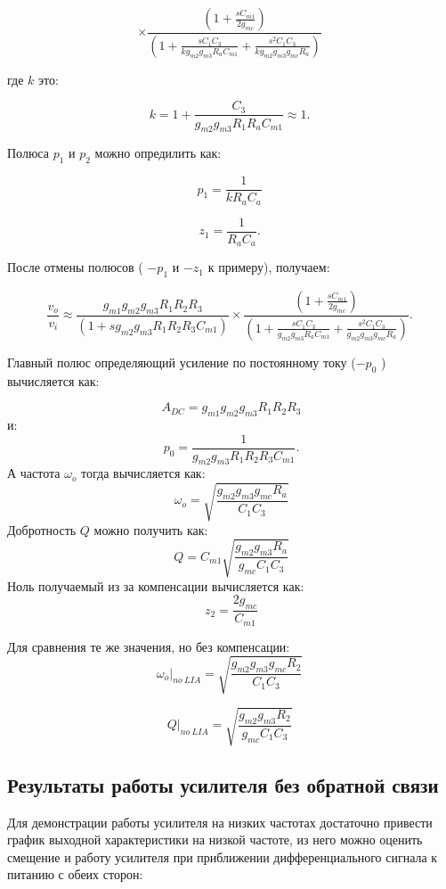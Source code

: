 \documentclass[a4paper,12pt]{article} %
\begin{document}
$$ \times  \frac{\left(1+\frac{sC_{m1}}{2g_{mc}}\right)}{\left(1 + \frac{sC_{1}C_{3}}{kg_{m2}g_{m3}R_{a}C_{m1}} + \frac{s^{2}C_{1}C_{3}}{kg_{m2}g_{m3}g_{mc}R_{a}}\right)}\; $$


где $k$ это:

$$k = 1 + \frac{C_{3}}{g_{m2}g_{m3}R_{1}R_{a}C_{m1}}\approx1.\;$$

Полюса $p_1$  и $p_2$ можно опредилить как:

$$p_{1} = \frac{1}{kR_{a}C_{a}}\;$$

$$z_{1} = \frac{1}{R_{a}C_{a}}.\;$$

После отмены полюсов ( $ -p_1 $ и  $  -z_1 $ к примеру), получаем:

$$\frac{v_{o}}{v_{i}}\approx\frac{g_{m1}g_{m2}g_{m3}R_{1}R_{2}R_{3}}{\left(1+sg_{m2}g_{m3}R_{1}R_{2}R_{3}C_{m1}\right)}\times\frac{\left(1+\frac{sC_{m1}}{2g_{mc}}\right)}{\left(1 + \frac{sC_{1}C_{3}}{g_{m2}g_{m3}R_{a}C_{m1}} + \frac{s^{2}C_{1}C_{3}}{g_{m2}g_{m3}g_{mc}R_{a}}\right)}.\;$$

Главный полюс определяющий усиление по постоянному току ($ -p_0 $ ) вычисляется как:


$$A_{DC} = g_{m1}g_{m2}g_{m3}R_{1}R_{2}R_{3}$$
и:
$$p_{0} = \frac{1}{g_{m2}g_{m3}R_{1}R_{2}R_{3}C_{m1}}.$$
А частота $\omega_{o}  $ тогда вычисляется как:
$$\omega_{o} = \sqrt{\frac{g_{m2}g_{m3}g_{mc}R_{a}}{C_{1}C_{3}}}$$
Добротность  $Q$ можно получить как:
$$Q = C_{m1}\sqrt{\frac{g_{m2}g_{m3}R_{a}}{g_{mc}C_{1}C_{3}}}$$
Ноль получаемый из за компенсации вычисляется как:
$$z_{2} = \frac{2g_{mc}}{C_{m1}}$$


Для сравнения те же значения, но без компенсации:
$$\omega_{o}|_{no\:LIA} = \sqrt{\frac{g_{m2}g_{m3}g_{mc}R_{2}}{C_{1}C_{3}}}\;$$


$$Q|_{no\:LIA} = \sqrt{\frac{g_{m2}g_{m3}R_{2}}{g_{mc}C_{1}C_{3}}}\;$$



\subsection{Результаты работы усилителя без обратной связи}





Для демонстрации работы усилителя на низких частотах достаточно привести график выходной характеристики на низкой частоте, из него можно оценить смещение и работу усилителя при приближении дифференциального сигнала к питанию с обеих сторон:
\end{document}
